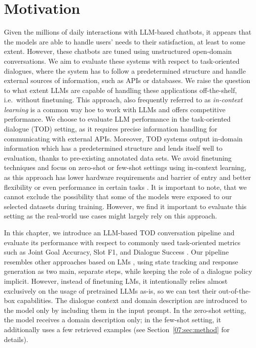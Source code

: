 \section{Motivation}
Given the millions of daily interactions with LLM-based chatbots, it appears that the models are able to handle users' needs to their satisfaction, at least to some extent.
However, these chatbots are tuned using unstructured open-domain conversations.
We aim to evaluate these systems with respect to task-oriented dialogues, where the system has to follow a predetermined structure and handle external sources of information, such as APIs or databases.
We raise the question to what extent LLMs are capable of handling these applications off-the-shelf, i.e.\ without finetuning.
This approach, also frequently referred to as \emph{in-context learning} is a common way hoe to work with LLMs and offers competitive performance.
We choose to evaluate LLM performance in the task-oriented dialogue (TOD) setting,
as it requires precise information handling for communicating with external APIs.
Moreover, TOD systems output in-domain information which has a predetermined structure and lends itself well to evaluation, thanks to pre-existing annotated data sets.
We avoid finetuning techniques and focus on zero-shot or few-shot settings using in-context learning, as this approach has lower hardware requirements and barrier of entry and better flexibility or even performance in certain tasks \cite{su2022selective}.
It is important to note, that we cannot exclude the possibility that some of the models were exposed to our selected datasets during training.
However, we find it important to evaluate this setting as the real-world use cases might largely rely on this approach.

In this chapter, we introduce an LLM-based TOD conversation pipeline and evaluate its performance with respect to commonly used task-oriented metrics such as Joint Goal Accuracy, Slot F1, and Dialogue Success \cite{rastogi_multi-task_2018,budzianowski_multiwoz_2018}.
Our pipeline resembles other approaches based on LMs \cite{peng-etal-2021-soloist,yang2021ubar}, using state tracking and response generation as two main, separate steps, while keeping the role of a dialogue policy implicit.
However, instead of finetuning LMs, it intentionally relies almost exclusively on the usage of pretrained LLMs as-is, so we can test their out-of-the-box capabilities.
The dialogue context and domain description are introduced to the model only by including them in the input prompt.
In the zero-shot setting, the model receives a domain description only; in the few-shot setting, it additionally uses a few retrieved examples (see Section~\ref{07:sec:method} for details).

